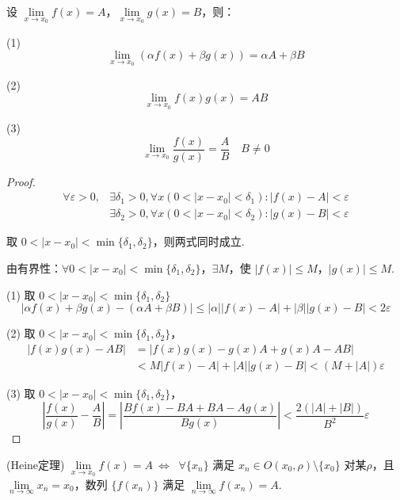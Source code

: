 \begin{proposition}
	设 $\lim\limits_{x \to x_0} f(x) = A$，$\lim\limits_{x \to x_0} g(x) = B$，则：
	
	(1) $$\lim_{x \to x_0} (\alpha f(x) + \beta g(x)) = \alpha A + \beta B$$
	
	(2) $$\lim_{x \to x_0} f(x)g(x) = AB$$
	
	(3) $$\lim_{x \to x_0} \frac{f(x)}{g(x)} = \frac{A}{B}\quad B \neq 0$$ 
	
\end{proposition}
\begin{proof}
	$$\begin{aligned}
		\forall \varepsilon > 0,&\exists \delta_1 > 0,\forall x (0 < |x - x_0| < \delta_1): |f(x) - A| < \varepsilon\\
		&\exists \delta_2 > 0,\forall x (0 < |x - x_0| < \delta_2): |g(x) - B| < \varepsilon
	\end{aligned}$$
	
	取 $0 < |x - x_0| < \min\{\delta_1, \delta_2\}$，则两式同时成立.
	
	由有界性：$\forall 0 < |x - x_0| < \min\{\delta_1, \delta_2\}$，$\exists M$，使 $|f(x)| \leqslant M$，$|g(x)| \leqslant M$.
	
	(1)	取 $0 < |x - x_0| < \min\{\delta_1, \delta_2\}$
	\[
	|\alpha f(x) + \beta g(x) - (\alpha A + \beta B)| \leqslant |\alpha||f(x) - A| + |\beta||g(x) - B| < 2\varepsilon
	\]
	
	(2) 取 $0 < |x - x_0| < \min\{\delta_1, \delta_2\}$，
	$$\begin{aligned}
		|f(x)g(x) - AB| &= |f(x)g(x) - g(x)A + g(x)A - AB|\\ 
		&< M|f(x) - A| + |A||g(x) - B| < (M + |A|)\varepsilon
	\end{aligned}$$
	
	
	(3) 取 $0 < |x - x_0| < \min\{\delta_1, \delta_2\}$，
	\[
	\left|\frac{f(x)}{g(x)} - \frac{A}{B}\right| = \left|\frac{Bf(x) - BA + BA - Ag(x)}{Bg(x)}\right| < \frac{2(|A| + |B|)}{B^2} \varepsilon
	\]
	
\end{proof}
\begin{theorem}(Heine定理)\label{Heine1}
	$\lim\limits_{x \to x_0} f(x) = A~\Leftrightarrow~$ $\forall \{x_n\}$ 满足 $x_n \in O(x_0, \rho) \setminus \{x_0\}$ 对某$\rho$，且 $\lim\limits_{n \to \infty} x_n = x_0$，数列 $\{f(x_n)\}$ 满足 $\lim\limits_{n \to \infty} f(x_n) = A$.
\end{theorem}
